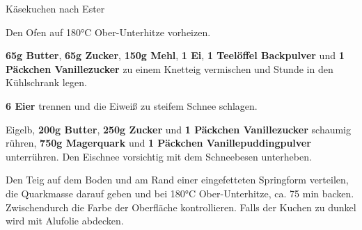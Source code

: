 \begin{recipe}[]{Käsekuchen nach Ester}
	\personcount{} %

\step
Den Ofen auf 180°C Ober-Unterhitze vorheizen.

\step
\textbf{65g Butter}, \textbf{65g Zucker}, \textbf{150g Mehl}, \textbf{1 Ei}, \textbf{1 Teelöffel Backpulver} und \textbf{1 Päckchen Vanillezucker} zu einem Knetteig vermischen und  Stunde in den Kühlschrank legen.

\step
\textbf{6 Eier} trennen und die Eiweiß zu steifem Schnee schlagen.

\step
Eigelb, \textbf{200g Butter}, \textbf{250g Zucker} und \textbf{1 Päckchen Vanillezucker} schaumig rühren, \textbf{750g Magerquark} und \textbf{1 Päckchen Vanillepuddingpulver} unterrühren. Den Eischnee vorsichtig mit dem Schneebesen unterheben.

\step
Den Teig auf dem Boden und am Rand einer eingefetteten Springform verteilen, die Quarkmasse darauf geben und bei 180°C Ober-Unterhitze, ca. 75 min backen. Zwischendurch die Farbe der Oberfläche kontrollieren. Falls der Kuchen zu dunkel wird mit Alufolie abdecken.

\end{recipe}